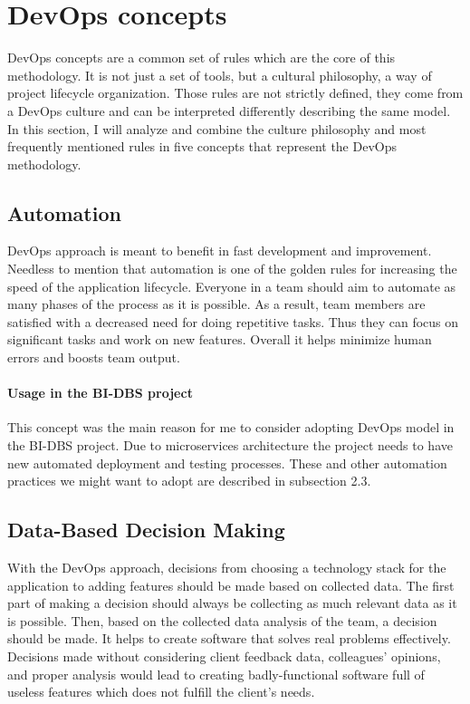\section{DevOps concepts} DevOps concepts are a common set of rules which are the core of this methodology. It is not just a set of tools, but a cultural philosophy, a way of project lifecycle organization. Those rules are not strictly defined, they come from a DevOps culture and can be interpreted differently describing the same model. In this section, I will analyze and combine the culture philosophy and most frequently mentioned rules \cite{devops-conc1, devops-conc2} in five concepts that represent the DevOps methodology.

\subsection{Automation} DevOps approach is meant to benefit in fast development and improvement. Needless to mention that automation is one of the golden rules for increasing the speed of the application lifecycle. Everyone in a team should aim to automate as many phases of the process as it is possible. As a result, team members are satisfied with a decreased need for doing repetitive tasks. Thus they can focus on significant tasks and work on new features. Overall it helps minimize human errors and boosts team output.

\paragraph*{Usage in the BI-DBS project} This concept was the main reason for me to consider adopting DevOps model in the BI-DBS project. Due to microservices architecture the project needs to have new automated deployment and testing processes. These and other automation practices we might want to adopt are described in subsection 2.3.


\subsection{Data-Based Decision Making} With the DevOps approach, decisions from choosing a technology stack for the application to adding features should be made based on collected data. The first part of making a decision should always be collecting as much relevant data as it is possible. Then, based on the collected data analysis of the team, a decision should be made. It helps to create software that solves real problems effectively. Decisions made without considering client feedback data, colleagues' opinions, and proper analysis would lead to creating badly-functional software full of useless features which does not fulfill the client's needs.

